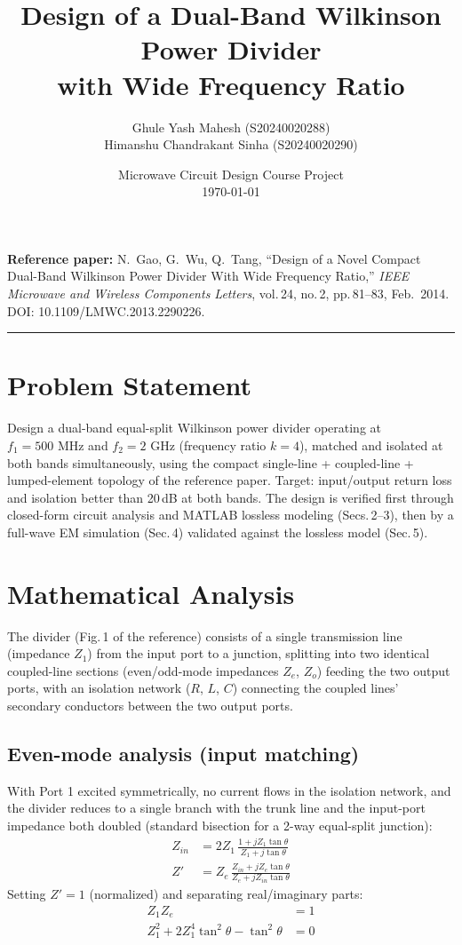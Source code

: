 \documentclass[11pt]{article}
\title{\color{mcdblue}\textbf{Design of a Dual-Band Wilkinson Power Divider\\ with Wide Frequency Ratio}}
\author{Ghule Yash Mahesh \quad (S20240020288) \\ Himanshu Chandrakant Sinha \quad (S20240020290)}
\date{Microwave Circuit Design Course Project \\ \today}
\begin{document}
\maketitle

\begin{center}
\begin{minipage}{0.85\linewidth}
\small
\textbf{Reference paper:} N.\ Gao, G.\ Wu, Q.\ Tang, ``Design of a Novel Compact
Dual-Band Wilkinson Power Divider With Wide Frequency Ratio,'' \emph{IEEE Microwave
and Wireless Components Letters}, vol.\,24, no.\,2, pp.\,81--83, Feb.\ 2014.
DOI: 10.1109/LMWC.2013.2290226.
\end{minipage}
\end{center}
\vspace{6pt}
\hrule
\vspace{10pt}

\section{Problem Statement}
Design a dual-band equal-split Wilkinson power divider operating at
$f_1 = 500\text{ MHz}$ and $f_2 = 2\text{ GHz}$ (frequency ratio $k=4$), matched and
isolated at both bands simultaneously, using the compact single-line + coupled-line +
lumped-element topology of the reference paper. Target: input/output return loss and
isolation better than 20\,dB at both bands. The design is verified first through
closed-form circuit analysis and MATLAB lossless modeling (Secs.\,2--3), then by a
full-wave EM simulation (Sec.\,4) validated against the lossless model (Sec.\,5).

\section{Mathematical Analysis}
The divider (Fig.\,1 of the reference) consists of a single transmission line
(impedance $Z_1$) from the input port to a junction, splitting into two identical
coupled-line sections (even/odd-mode impedances $Z_e$, $Z_o$) feeding the two output
ports, with an isolation network ($R$, $L$, $C$) connecting the coupled lines'
secondary conductors between the two output ports.

\subsection{Even-mode analysis (input matching)}
With Port 1 excited symmetrically, no current flows in the isolation network, and the
divider reduces to a single branch with the trunk line and the input-port impedance
both doubled (standard bisection for a 2-way equal-split junction):
\begin{align}
Z_{in} &= 2Z_1\,\frac{1+jZ_1\tan\theta}{Z_1+j\tan\theta} \\
Z' &= Z_e\,\frac{Z_{in}+jZ_e\tan\theta}{Z_e+jZ_{in}\tan\theta}
\end{align}
Setting $Z'=1$ (normalized) and separating real/imaginary parts:
\begin{align}
Z_1 Z_e &= 1 \label{eq:ZeZ1}\\
Z_1^2 + 2Z_1^4\tan^2\theta - \tan^2\theta &= 0 \label{eq:quad}
\end{align}
\end{document}
